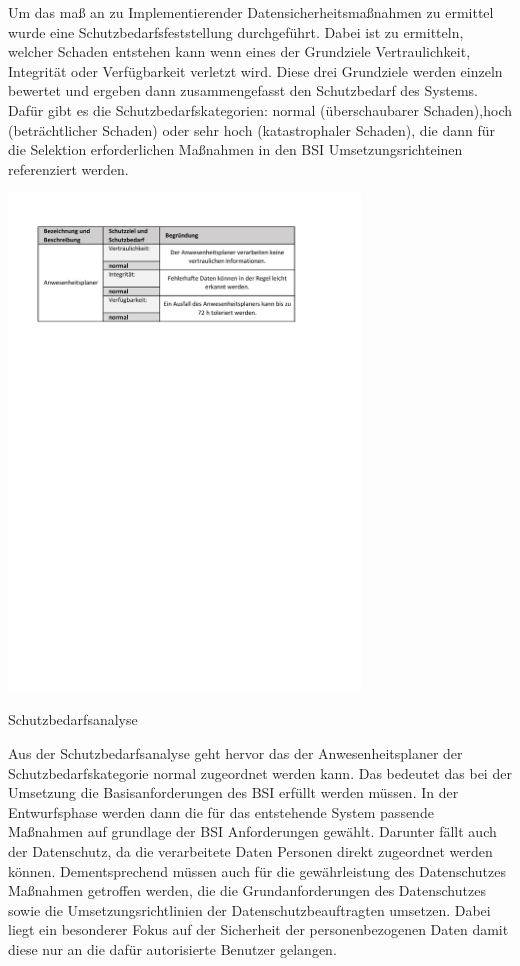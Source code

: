 Um das maß an zu Implementierender Datensicherheitsmaßnahmen zu ermittel wurde eine Schutzbedarfsfeststellung durchgeführt. Dabei ist zu ermitteln, welcher Schaden entstehen kann wenn eines der Grundziele Vertraulichkeit, Integrität oder Verfügbarkeit verletzt wird. Diese drei Grundziele werden einzeln bewertet und ergeben dann zusammengefasst den Schutzbedarf des Systems. Dafür gibt es die Schutzbedarfskategorien: normal (überschaubarer Schaden),hoch (beträchtlicher Schaden) oder sehr hoch (katastrophaler Schaden), die dann für die Selektion erforderlichen Maßnahmen in den BSI Umsetzungsrichteinen referenziert werden.

\begin{table}[htbp]
    \centering
    \includegraphics[width=0.7\textwidth,angle=0]{abb/Schutzbedarfsanalyse.pdf}
    \caption[Beschreibung]{Schutzbedarfsanalyse}
    \label{abb:Schutzbedarfsanalyse}
\end{table}

Aus der Schutzbedarfsanalyse geht hervor das der Anwesenheitsplaner der Schutzbedarfskategorie normal zugeordnet werden kann. Das bedeutet das bei der Umsetzung die Basisanforderungen des BSI erfüllt werden müssen. In der Entwurfsphase werden dann die für das entstehende System passende Maßnahmen auf grundlage der BSI Anforderungen gewählt. Darunter fällt auch der Datenschutz, da die verarbeitete Daten Personen direkt zugeordnet werden können. Dementsprechend müssen auch für die gewährleistung des Datenschutzes Maßnahmen getroffen werden, die die Grundanforderungen des Datenschutzes sowie die Umsetzungsrichtlinien der Datenschutzbeauftragten umsetzen. Dabei liegt ein besonderer Fokus auf der Sicherheit der personenbezogenen Daten damit diese nur an die dafür autorisierte Benutzer gelangen.

